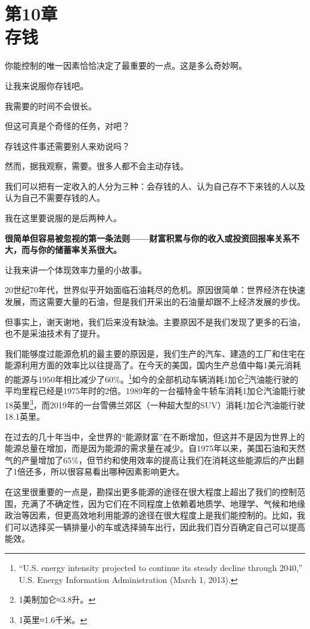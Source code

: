 
\section[第10章\q 存钱]{第10章\\ 存钱}

{\kaishu

你能控制的唯一因素恰恰决定了最重要的一点。这是多么奇妙啊。

}

让我来说服你存钱吧。

我需要的时间不会很长。

但这可真是个奇怪的任务，对吧？

存钱这件事还需要别人来劝说吗？

然而，据我观察，需要。很多人都不会主动存钱。

我们可以把有一定收入的人分为三种：会存钱的人、认为自己存不下来钱的人以及认为自己不需要存钱的人。

我在这里要说服的是后两种人。

\textbf{很简单但容易被忽视的第一条法则——财富积累与你的收入或投资回报率关系不大，而与你的储蓄率关系很大。}

让我来讲一个体现效率力量的小故事。

20世纪70年代，世界似乎开始面临石油耗尽的危机。原因很简单：世界经济在快速发展，而这需要大量的石油，但是我们开采出的石油量却跟不上经济发展的步伐。

但事实上，谢天谢地，我们后来没有缺油。主要原因不是我们发现了更多的石油，也不是采油技术有了提升。

我们能够度过能源危机的最主要的原因是，我们生产的汽车、建造的工厂和住宅在能源利用方面的效率比以往提高了。在今天的美国，国内生产总值中每1美元消耗的能源与1950年相比减少了60\%。\footnote{“U.S. energy intensity projected to continue its steady decline through 2040,” U.S. Energy Information Administration (March 1, 2013).}如今的全部机动车辆消耗1加仑\footnote{1美制加仑≈3.8升。}汽油能行驶的平均里程已经是1975年时的2倍。1989年的一台福特金牛轿车消耗1加仑汽油能行驶18英里\footnote{1英里≈1.6千米。}，而2019年的一台雪佛兰郊区（一种超大型的SUV）消耗1加仑汽油能行驶18.1英里。

在过去的几十年当中，全世界的“能源财富”在不断增加，但这并不是因为世界上的能源总量在增加，而是因为能源的需求量在减少。自1975年以来，美国石油和天然气的产量增加了65\%，但节约和使用效率的提高让我们在消耗这些能源后的产出翻了1倍还多，所以很容易看出哪种因素影响更大。

在这里很重要的一点是，勘探出更多能源的途径在很大程度上超出了我们的控制范围，充满了不确定性，因为它们在不同程度上依赖着地质学、地理学、气候和地缘政治等因素，但更高效地利用能源的途径在很大程度上是我们能控制的。比如，我们可以选择买一辆排量小的车或选择骑车出行，因此我们百分百确定自己可以提高能效。

